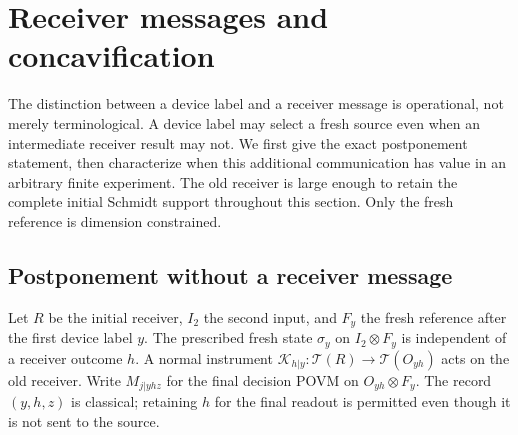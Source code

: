 \section{Receiver messages and concavification}
\label{sec:messages96}
The distinction between a device label and a receiver message is
operational, not merely terminological.  A device label may select a
fresh source even when an intermediate receiver result may not.  We
first give the exact postponement statement, then characterize when
this additional communication has value in an arbitrary finite
experiment.  The old receiver is large enough to retain the complete
initial Schmidt support throughout this section.  Only the fresh
reference is dimension constrained.

\subsection{Postponement without a receiver message}
Let $R$ be the initial receiver, $I_2$ the second input, and $F_y$ the
fresh reference after the first device label $y$.  The prescribed fresh
state $\sigma_y$ on $I_2\otimes F_y$ is independent of a receiver outcome
$h$.  A normal instrument $\mathcal K_{h|y}:\mathcal T(R)\to
\mathcal T(O_{yh})$ acts on the old receiver.  Write
$M_{j|yhz}$ for the final decision POVM on $O_{yh}\otimes F_y$.
The record $(y,h,z)$ is classical; retaining $h$ for the final readout
is permitted even though it is not sent to the source.

